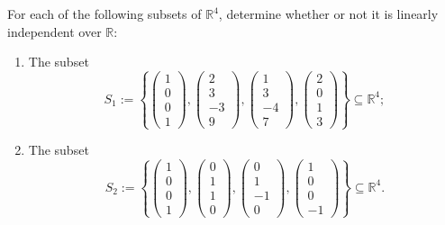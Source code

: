 \begin{exercise}
\label{exc:linear_independence_r4_lists}
For each of the following subsets of $\mathbb{R}^4$, determine whether or not it is linearly independent over $\mathbb{R}$:
\begin{enumerate}
    \item The subset
    \[
    S_1 := \left\{ \begin{pmatrix} 1 \\ 0 \\ 0 \\ 1 \end{pmatrix}, \begin{pmatrix} 2 \\ 3 \\ -3 \\ 9 \end{pmatrix}, \begin{pmatrix} 1 \\ 3 \\ -4 \\ 7 \end{pmatrix}, \begin{pmatrix} 2 \\ 0 \\ 1 \\ 3 \end{pmatrix} \right\} \subseteq \mathbb{R}^4;
    \]
    \item The subset
    \[
    S_2 := \left\{ \begin{pmatrix} 1 \\ 0 \\ 0 \\ 1 \end{pmatrix}, \begin{pmatrix} 0 \\ 1 \\ 1 \\ 0 \end{pmatrix}, \begin{pmatrix} 0 \\ 1 \\ -1 \\ 0 \end{pmatrix}, \begin{pmatrix} 1 \\ 0 \\ 0 \\ -1 \end{pmatrix} \right\} \subseteq \mathbb{R}^4.
    \]
\end{enumerate}
\end{exercise}

